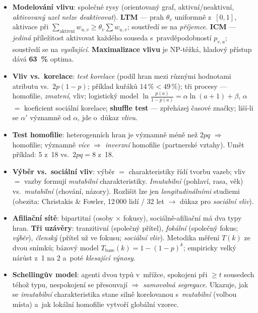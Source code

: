 \documentclass[11pt,a4paper]{article}
\theoremstyle{definition}
\begin{document}
\begin{itemize}
 smíšený model (halo efekt). \textbf{Centralizace} a~struktura \emph{jádro--periferie}
 (bow-tie analýza).
\item \textbf{Modelování vlivu}: společné rysy (orientovaný graf, aktivní/neaktivní,
 \emph{aktivovaný uzel nelze deaktivovat}). \textbf{LTM} --- prah $\theta_v$ uniformně
 z~$[0,1]$, aktivace při $\sum_{\text{aktivní}}w_{u,v}\ge\theta_v\sum w_{u,v}$; soustředí
 se na \emph{příjemce}. \textbf{ICM} --- \emph{jediná} příležitost aktivovat každého
 souseda s~pravděpodobností $p_{v,u}$; soustředí se na \emph{vysílající}.
 \textbf{Maximalizace vlivu} je NP-těžká, hladový přístup dává \textbf{63~\%} optima.
\item \textbf{Vliv vs.\ korelace}: \emph{test korelace} (podíl hran mezi různými hodnotami
 atributu vs.\ $2p(1-p)$; příklad kuřáků $14\,\%<49\,\%$); tři procesy --- homofilie,
 \emph{zmatení}, vliv; logistický model $\ln\frac{p(a)}{1-p(a)}=\alpha\ln(a+1)+\beta$,
 $\alpha$ $=$ koeficient sociální korelace; \textbf{shuffle test} --- zpřeházej časové
 značky; liší-li se $\alpha'$ významně od $\alpha$, jde o~důkaz \emph{vlivu}.
\item \textbf{Test homofilie}: heterogenních hran je významně méně než $2pq$ $\Rightarrow$
 homofilie; významně \emph{více} $\Rightarrow$ \emph{inverzní} homofilie (partnerské
 vztahy). Umět příklad: 5 z~18 vs.\ $2pq=8$ z~18.
\item \textbf{Výběr vs.\ sociální vliv}: výběr $=$ charakteristiky řídí tvorbu vazeb; vliv $=$
 vazby formují \emph{mutabilní} charakteristiky. \emph{Imutabilní} (pohlaví, rasa, věk)
 vs.\ \emph{mutabilní} (chování, názory). Rozlišit lze jen \emph{longitudinálními}
 studiemi (obezita: Christakis \& Fowler, 12\,000 lidí / 32 let $\to$ důkaz pro
 \emph{sociální vliv}).
\item \textbf{Afiliační sítě}: bipartitní (osoby $\times$ fokusy), sociálně-afiliační má dva
 typy hran. \textbf{Tři uzávěry}: tranzitivní (společný přítel), \emph{fokální} (společný
 fokus; \emph{výběr}), \emph{členský} (přítel už ve fokusu; \emph{sociální vliv}).
 Metodika měření $T(k)$ ze dvou snímků; bázový model $T_{\text{base}}(k)=1-(1-p)^k$;
 empiricky velký nárůst z~1 na 2 a~poté \emph{klesající výnosy}.
\item \textbf{Schellingův model}: agenti dvou typů v~mřížce, spokojeni při $\ge t$ sousedech
 téhož typu, nespokojení se přesouvají $\Rightarrow$ \emph{samovolná segregace}. Ukazuje,
 jak se \emph{imutabilní} charakteristika stane silně korelovanou s~\emph{mutabilní}
 (volbou místa) a~jak lokální homofilie vytvoří globální vzorec.

\end{itemize}
\end{document}
